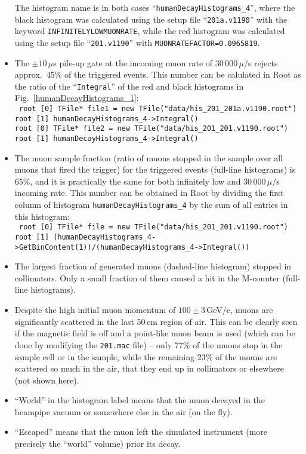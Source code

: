 \documentclass[twoside]{dis04}
\begin{document}
\begin{itemize}
        The histogram name is in both cases ``{\tt humanDecayHistograms\_4}'',
	where the black histogram was calculated using the setup file ``{\tt 201a.v1190}''
	with the keyword {\tt INFINITELYLOWMUONRATE}, while the red histogram
	was calculated using the setup file ``{\tt 201.v1190}''
	with {\tt MUONRATEFACTOR=0.0965819}.
  \item The $\pm 10\,\mu$s pile-up gate at the incoming muon rate of 30\,000$\,\mu/$s 
        rejects approx.\ 45\% of the triggered events.  This number can be calulated
	in Root as the ratio of the ``{\tt Integral}'' of the red and black histograms
	in Fig.~\ref{humanDecayHistograms_1}:\\[1em]
	{\tt \small
	  root [0] TFile* file1 = new TFile("data/his\_201\_201a.v1190.root") \\
	  root [1] humanDecayHistograms\_4->Integral() \\
	  root [0] TFile* file2 = new TFile("data/his\_201\_201.v1190.root") \\
	  root [1] humanDecayHistograms\_4->Integral() \\
	}
  \item The muon sample fraction (ratio of muons stopped in the sample over all muons that fired
        the trigger) for the triggered events (full-line histograms) 
	is 65\%, and it is practically the same
	for both infinitely low and 30\,000\,$\mu/$s incoming rate.
	This number can be obtained in Root by dividing the first column of histogram 
	{\tt humanDecayHistograms\_4} by the sum of all entries in this histogram:\\[1em]
	{\tt \small
	  root [0] TFile* file = new TFile("data/his\_201\_201.v1190.root") \\
	  root [1] (humanDecayHistograms\_4->GetBinContent(1))/(humanDecayHistograms\_4->Integral()) \\
	}
  \item The largest fraction of generated muons (dashed-line histogram) stopped in collimators.
        Only a small fraction of them caused a hit in the M-counter (full-line histograms).
  \item Despite the high initial muon momentum of $100 \pm 3\,$GeV/c, muons are 
        significantly scattered in the last 50\,cm region of air.  This can be
	clearly seen if the magnetic field is off and a point-like muon beam
	is used (which can be done by modifying the {\tt 201.mac} file)
	-- only 77\% of the muons stop in the sample cell or in the sample, while the
	remaining 23\% of the mouns are scattered so much in the air, that they
	end up in collimators or elsewhere (not shown here).
  \item ``World'' in the histogram label means that the muon decayed in the beampipe vacuum 
        or somewhere else in the air (on the fly). 
  \item ``Escaped'' means that the muon left the simulated instrument (more precisely the 
        ``world'' volume) prior its decay.
\end{itemize}
\end{document}
